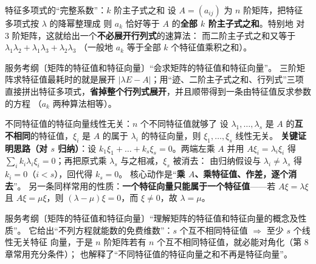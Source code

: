 \begin{fdeep}{特征多项式的“完整系数”：$k$ 阶主子式之和}
设 $A=(a_{ij})$ 为 $n$ 阶矩阵，把特征多项式按 $\lambda$ 的降幂整理成
则 $a_k$ 恰好等于 $A$ 的\textbf{全部 $k$ 阶主子式之和}。特别地
对 $3$ 阶矩阵，这就给出一个\textbf{不必展开行列式}的速算法：
而二阶主子式之和又等于 $\lambda_1\lambda_2+\lambda_1\lambda_3+\lambda_2\lambda_3$
（一般地 $a_k$ 等于全部 $k$ 个特征值乘积之和）。

\fbref{}服务考纲〔矩阵的特征值和特征向量〕“会求矩阵的特征值和特征向量”。
三阶矩阵求特征值最耗时的就是展开 $|\lambda E-A|$；用“迹、二阶主子式之和、行列式”三项
直接拼出特征多项式，\textbf{省掉整个行列式展开}，并且顺带得到一条由特征值反求参数的方程
（$a_k$ 两种算法相等）。
\end{fdeep}

\begin{fdeep}{不同特征值的特征向量线性无关：$n$ 个不同特征值就够了}
 设 $\lambda_1,\dots,\lambda_s$ 是 $A$ 的\textbf{互不相同}的特征值，$\xi_i$ 是 $A$ 的属于
$\lambda_i$ 的特征向量，则 $\xi_1,\dots,\xi_s$ 线性无关。
\textbf{关键证明思路（对 $s$ 归纳）}：设 $k_1\xi_1+\dots+k_s\xi_s=0$。两端左乘 $A$ 并用 $A\xi_i=\lambda_i\xi_i$ 得
$\sum_ik_i\lambda_i\xi_i=0$；再把原式乘 $\lambda_s$ 与之相减，$\xi_s$ 被消去：
由归纳假设与 $\lambda_i\ne\lambda_s$ 得 $k_i=0$（$i<s$），回代得 $k_s=0$。
核心动作是“\textbf{乘 $A$、乘特征值、作差，逐个消去}”。
另一条同样常用的性质：\textbf{一个特征向量只能属于一个特征值}——若 $A\xi=\lambda\xi$ 且
$A\xi=\mu\xi$，则 $(\lambda-\mu)\xi=0$，而 $\xi\ne0$，故 $\lambda=\mu$。

\fbref{}服务考纲〔矩阵的特征值和特征向量〕“理解矩阵的特征值和特征向量的概念及性质”。
它给出“不列方程就能数的免费维数”：$s$ 个互不相同特征值 $\Rightarrow$ 至少 $s$ 个线性无关特征
向量，于是 $n$ 阶矩阵若有 $n$ 个互不相同特征值，就必能对角化（第 8 章常用充分条件）；
也解释了“不同特征值的特征向量之和不再是特征向量”。
\end{fdeep}

